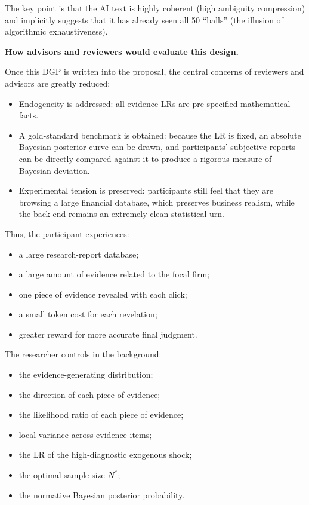 The key point is that the AI text is highly coherent (high ambiguity compression) and implicitly suggests that it has already seen all 50 ``balls'' (the illusion of algorithmic exhaustiveness).

\textbf{How advisors and reviewers would evaluate this design.}

Once this DGP is written into the proposal, the central concerns of reviewers and advisors are greatly reduced:
\begin{itemize}[leftmargin=1.5em]
\item Endogeneity is addressed: all evidence LRs are pre-specified mathematical facts.
\item A gold-standard benchmark is obtained: because the LR is fixed, an absolute Bayesian posterior curve can be drawn, and participants' subjective reports can be directly compared against it to produce a rigorous measure of Bayesian deviation.
\item Experimental tension is preserved: participants still feel that they are browsing a large financial database, which preserves business realism, while the back end remains an extremely clean statistical urn.
\end{itemize}

Thus, the participant experiences:
\begin{itemize}[leftmargin=1.5em]
\item a large research-report database;
\item a large amount of evidence related to the focal firm;
\item one piece of evidence revealed with each click;
\item a small token cost for each revelation;
\item greater reward for more accurate final judgment.
\end{itemize}

The researcher controls in the background:
\begin{itemize}[leftmargin=1.5em]
\item the evidence-generating distribution;
\item the direction of each piece of evidence;
\item the likelihood ratio of each piece of evidence;
\item local variance across evidence items;
\item the LR of the high-diagnostic exogenous shock;
\item the optimal sample size \(N^{*}\);
\item the normative Bayesian posterior probability.
\end{itemize}

